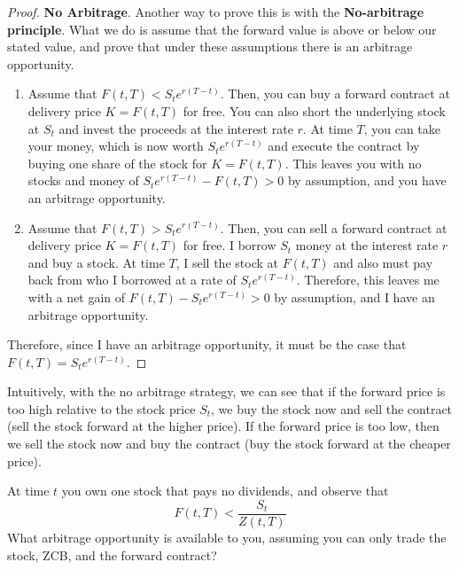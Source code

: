 \documentclass{article}
\begin{document}
    \begin{proof}
      \textbf{No Arbitrage}. Another way to prove this is with the \textbf{No-arbitrage principle}. What we do is assume that the forward value is above or below our stated value, and prove that under these assumptions there is an arbitrage opportunity. 
      \begin{enumerate}
        \item Assume that $F(t, T) < S_t e^{r (T - t)}$. Then, you can buy a forward contract at delivery price $K = F(t, T)$ for free. You can also short the underlying stock at $S_t$ and invest the proceeds at the interest rate $r$. At time $T$, you can take your money, which is now worth $S_t e^{r (T - t)}$ and execute the contract by buying one share of the stock for $K = F(t, T)$. This leaves you with no stocks and money of $S_t e^{r (T - t)} - F(t, T) > 0$ by assumption, and you have an arbitrage opportunity.
        \item Assume that $F(t, T) > S_t e^{r (T - t)}$. Then, you can sell a forward contract at delivery price $K = F(t, T)$ for free. I borrow $S_t$ money at the interest rate $r$ and buy a stock. At time $T$, I sell the stock at $F(t, T)$ and also must pay back from who I borrowed at a rate of $S_t e^{r (T - t)}$. Therefore, this leaves me with a net gain of $F(t, T) - S_t e^{r (T - t)} > 0$ by assumption, and I have an arbitrage opportunity.
      \end{enumerate}
      Therefore, since I have an arbitrage opportunity, it must be the case that $F(t, T) = S_t e^{r (T - t)}$.
    \end{proof}

    Intuitively, with the no arbitrage strategy, we can see that if the forward price is too high relative to the stock price $S_t$, we buy the stock now and sell the contract (sell the stock forward at the higher price). If the forward price is too low, then we sell the stock now and buy the contract (buy the stock forward at the cheaper price).

    \begin{exercise}
      At time $t$ you own one stock that pays no dividends, and observe that 
      \begin{equation}
        F(t, T) < \frac{S_t}{Z(t, T)} 
      \end{equation}
      What arbitrage opportunity is available to you, assuming you can only trade the stock, ZCB, and the forward contract? 
    \end{exercise}
\end{document}
